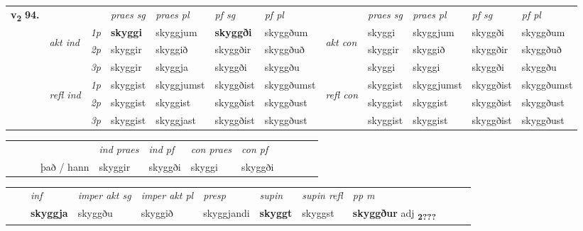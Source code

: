 \begin{tabular}{llllllllllll} \toprule
\multirow{4}{*}{{{\textbf{v{\textsubscript{2}}} \Large{\textbf{94.}}}}}  & &   &  \textit{praes sg}  & \textit{praes pl}  &\textit{ pf sg} & \textit{pf pl} &  &  \textit{praes sg}  & \textit{praes pl}  & \textit{pf sg} & \textit{pf pl } \\*
	\cmidrule{4-7} \cmidrule{9-12}
 & \multirow{3}{*}{\begin{turn}{90}\textit{akt ind}\end{turn}} & {\textit{1p}} & \textbf{skyggi} & skyggjum    & \textbf{skyggði} & skyggðum & \multirow{3}{*}{\begin{turn}{90}\textit{akt con}\end{turn}} &skyggi & skyggjum & skyggði & skyggðum\\*
& &  {\textit{2p}} &  skyggir  & skyggið   & skyggðir & skyggðuð & & skyggir & skyggið & skyggðir & skyggðuð \\*
& &  {\textit{3p}} & skyggir & skyggja   & skyggði & skyggðu & & skyggi & skyggi& skyggði & skyggðu  \\*
\cmidrule{4-7} \cmidrule{9-12}
 &\multirow{3}{*}{\begin{turn}{90}\textit{refl ind}\end{turn}} & {\textit{1p}} & skyggist & skyggjumst    & skyggðist & skyggðumst & \multirow{3}{*}{\begin{turn}{90}\textit{refl con}\end{turn}}  &skyggist & skyggjumst & skyggðist & skyggðumst\\*
 &&  {\textit{2p}} &  skyggist  & skyggist   & skyggðist & skyggðust & &skyggist & skyggist & skyggðist & skyggðust \\*
& &  {\textit{3p}} & skyggist & skyggjast   & skyggðist & skyggðust & & skyggist & skyggist& skyggðist & skyggðust  \\*
\cmidrule{4-7} \cmidrule{9-12}
\end{tabular}


\begin{tabular}{llllllllllll}
 & &  & &  \textit{ind praes} & \textit{ind pf} & \textit{con praes} & \textit{con pf} \\*
&  & & það / hann & skyggir & skyggði & skyggi & skyggði \\*
\cmidrule{5-9}
\end{tabular}


\begin{tabular}{llllllllllll}
 & & \textit{inf} & \textit{imper akt sg} & \textit{imper akt pl}   & \textit{presp} & \textit{supin} & \textit{supin refl} & \textit{pp m}     \\*
  & & \textbf{skyggja} & skyggðu  & skyggið   & skyggjandi &  \textbf{skyggt} & skyggst & \textbf{skyggður} adj \textbf{\textsubscript{2???}} \\*
\cmidrule{1-12}
\end{tabular}



